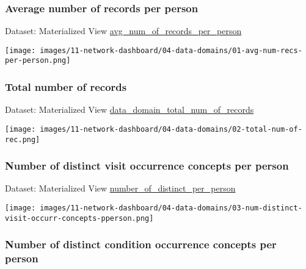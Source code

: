 \documentclass[
]{book}
\begin{document}
\hypertarget{average-number-of-records-per-person}{%
\subsubsection*{Average number of records per person}\label{average-number-of-records-per-person}}

Dataset: Materialized View \href{materialized-views-1.html\#avg_num_of_records_per_person}{avg\_num\_of\_records\_per\_person}

\texttt{[image: images/11-network-dashboard/04-data-domains/01-avg-num-recs-per-person.png]}

\hypertarget{total-number-of-records}{%
\subsubsection*{Total number of records}\label{total-number-of-records}}

Dataset: Materialized View \href{materialized-views-1.html\#data_domain_total_num_of_records}{data\_domain\_total\_num\_of\_records}

\texttt{[image: images/11-network-dashboard/04-data-domains/02-total-num-of-rec.png]}

\hypertarget{number-of-distinct-visit-occurrence-concepts-per-person}{%
\subsubsection*{Number of distinct visit occurrence concepts per person}\label{number-of-distinct-visit-occurrence-concepts-per-person}}

Dataset: Materialized View \href{materialized-views-1.html\#number_of_distinct_per_person}{number\_of\_distinct\_per\_person}

\texttt{[image: images/11-network-dashboard/04-data-domains/03-num-distinct-visit-occurr-concepts-pperson.png]}

\hypertarget{number-of-distinct-condition-occurrence-concepts-per-person}{%
\subsubsection*{Number of distinct condition occurrence concepts per person}\label{number-of-distinct-condition-occurrence-concepts-per-person}}
\end{document}
